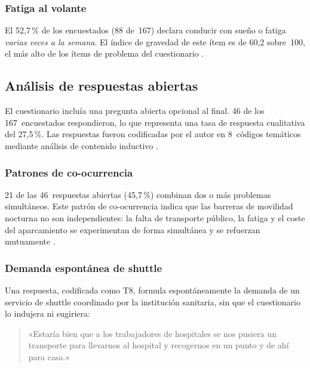 \subsubsection{Fatiga al volante}
\label{sec:fatiga-volante}

El 52{,}7\,\% de los encuestados (88 de~167) declara conducir con sueño o fatiga \emph{varias veces a la semana}. El índice de gravedad de este ítem es de 60{,}2 sobre~100, el más alto de los ítems de problema del cuestionario \parencite{LouridoRegueira2026}.

\subsection{Análisis de respuestas abiertas}
\label{sec:respuestas-abiertas}

El cuestionario incluía una pregunta abierta opcional al final. 46 de los 167~encuestados respondieron, lo que representa una tasa de respuesta cualitativa del 27{,}5\,\%. Las respuestas fueron codificadas por el autor en 8~códigos temáticos mediante análisis de contenido inductivo \parencite{LouridoRegueira2026}.

\subsubsection{Patrones de co-ocurrencia}
\label{sec:patrones-coocurrencia}

21 de las 46~respuestas abiertas (45{,}7\,\%) combinan dos o más problemas simultáneos. Este patrón de co-ocurrencia indica que las barreras de movilidad nocturna no son independientes: la falta de transporte público, la fatiga y el coste del aparcamiento se experimentan de forma simultánea y se refuerzan mutuamente \parencite{LouridoRegueira2026}.

\subsubsection{Demanda espontánea de shuttle}
\label{sec:demanda-espontanea}

Una respuesta, codificada como T8, formula espontáneamente la demanda de un servicio de shuttle coordinado por la institución sanitaria, sin que el cuestionario lo indujera ni sugiriera:

\begin{quote}
«Estaría bien que a los trabajadores de hospitales se nos pusiera un transporte para llevarnos al hospital y recogernos en un punto y de ahí para casa.»
\hfill\textit{\parencite{LouridoRegueira2026}}
\end{quote}

